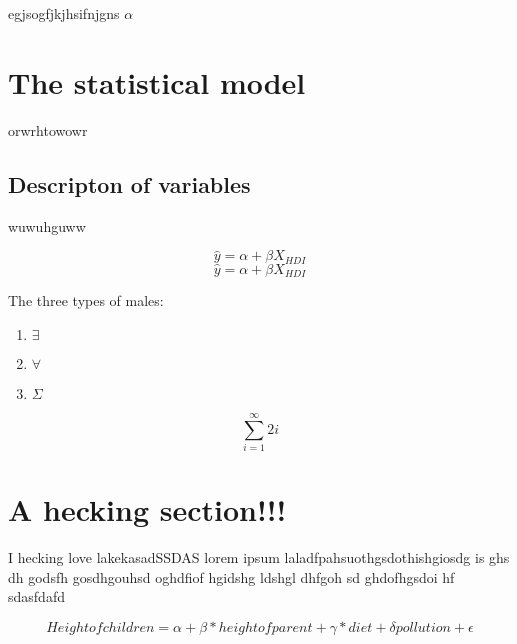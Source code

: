 \documentclass{article}
\begin{document}
egjsogfjkjhsifnjgns $\alpha$

\section{The statistical model}
orwrhtowowr
\subsection{Descripton of variables}
wuwuhguww

\begin{equation}
    \hat{y} = \alpha + \beta X_{HDI}
\end{equation}
$$\hat{y} = \alpha + \beta X_{HDI}$$

The three types of males:
\begin{enumerate}
    \item $\exists$
    \item $\forall$
    \item $\Sigma$
\end{enumerate}

$$\sum_{i=1} ^{\infty}{2i}$$
\section{A hecking section!!!}
I hecking love lakekasadSSDAS
lorem ipsum laladfpahsuothgsdothishgiosdg is ghs dh godsfh gosdhgouhsd oghdfiof hgidshg ldshgl dhfgoh sd ghdofhgsdoi hf
sdasfdafd

$$Height of children = \alpha + \beta *{height of parent} + \gamma *{diet} + \delta{pollution} + \epsilon$$
\end{document}
